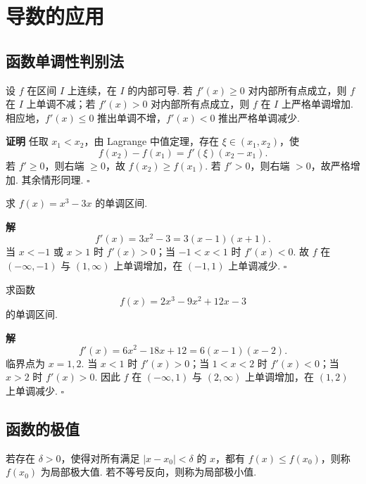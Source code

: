 \documentclass[fontset=fandol]{ctexart}
\newcounter{DefinitionCounter}[section]
\newcounter{TheoremCounter}[section]
\newcounter{PropositionCounter}[section]
\newcounter{ExampleCounter}[section]
\newcounter{ExerciseCounter}[section]
\newcounter{ProblemCounter}[section]
\newcounter{ConclusionCounter}[section]
\newenvironment{proofdetail}{\par\noindent\textbf{证明}\quad}{\hfill$\square$\par\vspace{0.8em}}
\newenvironment{solution}{\par\noindent\textbf{解}\quad}{\hfill$\square$\par\vspace{0.8em}}
\newcommand{\renewEnvironmentCounter}{\setcounter{DefinitionCounter}{0}\setcounter{TheoremCounter}{0}\setcounter{PropositionCounter}{0}\setcounter{ExampleCounter}{0}\setcounter{ExerciseCounter}{0}\setcounter{ProblemCounter}{0}\setcounter{ConclusionCounter}{0}}
\begin{document}
\section{导数的应用}
\renewEnvironmentCounter
\subsection{函数单调性判别法}

\begin{theorem}[单调性判别法]
设 $f$ 在区间 $I$ 上连续，在 $I$ 的内部可导. 若 $f'(x)\geq0$ 对内部所有点成立，则 $f$ 在 $I$ 上单调不减；若 $f'(x)>0$ 对内部所有点成立，则 $f$ 在 $I$ 上严格单调增加. 相应地，$f'(x)\leq0$ 推出单调不增，$f'(x)<0$ 推出严格单调减少.
\end{theorem}
\begin{proofdetail}
任取 $x_1<x_2$，由 Lagrange 中值定理，存在 $\xi\in(x_1,x_2)$，使
\[
f(x_2)-f(x_1)=f'(\xi)(x_2-x_1).
\]
若 $f'\geq0$，则右端 $\geq0$，故 $f(x_2)\geq f(x_1)$. 若 $f'>0$，则右端 $>0$，故严格增加. 其余情形同理.
\end{proofdetail}

\begin{example}[求单调区间]
求 $f(x)=x^3-3x$ 的单调区间.
\end{example}
\begin{solution}
\[
f'(x)=3x^2-3=3(x-1)(x+1).
\]
当 $x<-1$ 或 $x>1$ 时 $f'(x)>0$；当 $-1<x<1$ 时 $f'(x)<0$. 故 $f$ 在 $(-\infty,-1)$ 与 $(1,\infty)$ 上单调增加，在 $(-1,1)$ 上单调减少.
\end{solution}

\begin{example}[求单调区间]
求函数
\[
f(x)=2x^3-9x^2+12x-3
\]
的单调区间.
\end{example}
\begin{solution}
\[
f'(x)=6x^2-18x+12=6(x-1)(x-2).
\]
临界点为 $x=1,2$. 当 $x<1$ 时 $f'(x)>0$；当 $1<x<2$ 时 $f'(x)<0$；当 $x>2$ 时 $f'(x)>0$. 因此 $f$ 在 $(-\infty,1)$ 与 $(2,\infty)$ 上单调增加，在 $(1,2)$ 上单调减少.
\end{solution}

\subsection{函数的极值}

\begin{definition}[局部极值]
若存在 $\delta>0$，使得对所有满足 $|x-x_0|<\delta$ 的 $x$，都有 $f(x)\leq f(x_0)$，则称 $f(x_0)$ 为局部极大值. 若不等号反向，则称为局部极小值.
\end{definition}
\end{document}
